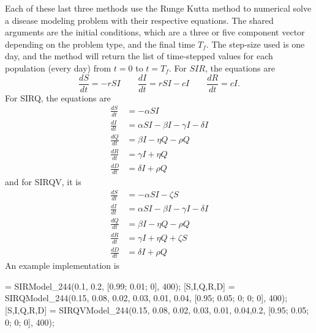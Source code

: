 Each of these last three methods use the Runge Kutta method to numerical solve a disease modeling problem with their respective equations. The shared arguments are the initial conditions, which are a three or five component vector depending on the problem type, and the final time $T_f$. The step-size used is one day, and the method will return the list of time-stepped values for each population (every day) from $t=0$ to $t=T_f$. For $SIR$, the equations are
\[ \frac{dS}{dt} = - rSI \qquad \frac{dI}{dt} = rSI - cI \qquad \frac{dR}{dt} = cI.  \] For SIRQ, the equations are
\[
    \begin{split}
        \frac{dS}{dt} &= -\alpha SI \\
        \frac{dI}{dt} &= \alpha SI - \beta I - \gamma I - \delta I \\
        \frac{dQ}{dt} &= \beta I - \eta Q - \rho Q \\
        \frac{dR}{dt} &= \gamma I + \eta Q \\
        \frac{dD}{dt} &= \delta I + \rho Q
    \end{split}
\] 
and for SIRQV, it is
\[
    \begin{split}
        \frac{dS}{dt} &= -\alpha SI- \zeta S \\
        \frac{dI}{dt} &= \alpha SI - \beta I - \gamma I - \delta I \\
        \frac{dQ}{dt} &= \beta I - \eta Q - \rho Q \\
        \frac{dR}{dt} &= \gamma I + \eta Q  + \zeta S\\
        \frac{dD}{dt} &= \delta I + \rho Q
    \end{split}
\] 
An example implementation is

\begin{matlab}
[S,I,R] = SIRModel_244(0.1, 0.2, [0.99; 0.01; 0], 400);
[S,I,Q,R,D] = SIRQModel_244(0.15, 0.08, 0.02, 0.03, 0.01, 0.04, [0.95; 0.05; 0; 0; 0], 400);
[S,I,Q,R,D] = SIRQVModel_244(0.15, 0.08, 0.02, 0.03, 0.01, 0.04,0.2, [0.95; 0.05; 0; 0; 0], 400);
\end{matlab}